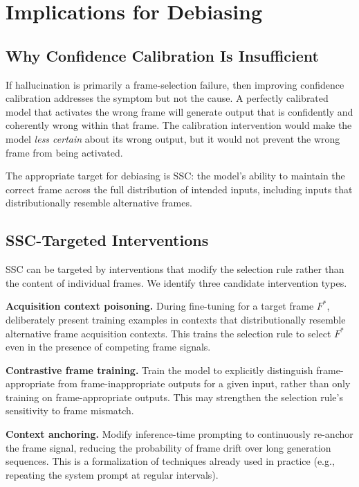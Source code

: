 \documentclass[12pt]{article}
\begin{document}
\section{Implications for Debiasing}

\subsection{Why Confidence Calibration Is Insufficient}

If hallucination is primarily a frame-selection failure, then
improving confidence calibration addresses the symptom but not
the cause. A perfectly calibrated model that activates the wrong
frame will generate output that is confidently and coherently
wrong within that frame. The calibration intervention would
make the model \emph{less certain} about its wrong output,
but it would not prevent the wrong frame from being activated.

The appropriate target for debiasing is SSC: the model's ability
to maintain the correct frame across the full distribution of
intended inputs, including inputs that distributionally resemble
alternative frames.

\subsection{SSC-Targeted Interventions}

SSC can be targeted by interventions that modify the selection rule
rather than the content of individual frames. We identify three
candidate intervention types.

\textbf{Acquisition context poisoning.} During fine-tuning for a
target frame $F^*$, deliberately present training examples in
contexts that distributionally resemble alternative frame
acquisition contexts. This trains the selection rule to select
$F^*$ even in the presence of competing frame signals.

\textbf{Contrastive frame training.} Train the model to
explicitly distinguish frame-appropriate from frame-inappropriate
outputs for a given input, rather than only training on
frame-appropriate outputs. This may strengthen the selection
rule's sensitivity to frame mismatch.

\textbf{Context anchoring.} Modify inference-time prompting to
continuously re-anchor the frame signal, reducing the probability
of frame drift over long generation sequences. This is a
formalization of techniques already used in practice (e.g.,
repeating the system prompt at regular intervals).
\end{document}
